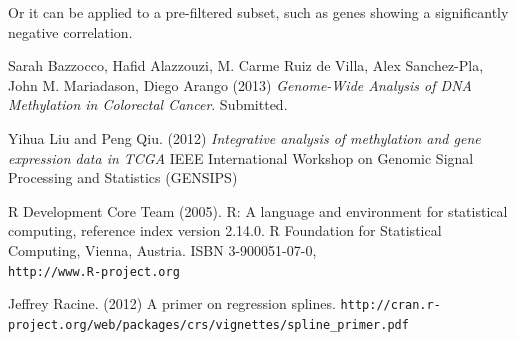 \documentclass[a4paper,10pt]{article}\usepackage[]{graphicx}\usepackage[]{xcolor}
\begin{document}
Or it can be applied to a pre-filtered subset, such as genes showing a significantly negative correlation.


\clearpage
\begin{thebibliography}{9}


 Sarah Bazzocco, Hafid Alazzouzi, M. Carme Ruiz de Villa, Alex Sanchez-Pla, John M. Mariadason, Diego Arango (2013) \emph{Genome-Wide Analysis of DNA Methylation in Colorectal Cancer}. Submitted.

 Yihua Liu and Peng Qiu. (2012) \emph{Integrative analysis of methylation and gene expression data in TCGA} IEEE International Workshop on Genomic Signal Processing and Statistics (GENSIPS)

 R Development Core Team (2005). R: A language and environment for statistical computing,  reference index version 2.14.0. R Foundation for Statistical Computing, Vienna, Austria. ISBN 3-900051-07-0, \\
  \verb|http://www.R-project.org|

 Jeffrey Racine. (2012) A primer on regression splines.\newline
\verb|http://cran.r-project.org/web/packages/crs/vignettes/spline_primer.pdf|

\end{thebibliography}
\end{document}
